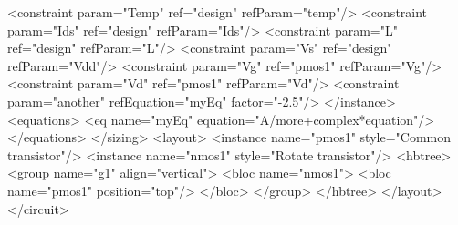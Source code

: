\begin{DoxyCodeInclude}
      <\textcolor{keywordtype}{constraint} \textcolor{keyword}{param}=\textcolor{stringliteral}{"Temp"} \textcolor{keyword}{ref}=\textcolor{stringliteral}{"design"} \textcolor{keyword}{refParam}=\textcolor{stringliteral}{"temp"}/>
      <\textcolor{keywordtype}{constraint} \textcolor{keyword}{param}=\textcolor{stringliteral}{"Ids"}  \textcolor{keyword}{ref}=\textcolor{stringliteral}{"design"} \textcolor{keyword}{refParam}=\textcolor{stringliteral}{"Ids"}/>
      <\textcolor{keywordtype}{constraint} \textcolor{keyword}{param}=\textcolor{stringliteral}{"L"}    \textcolor{keyword}{ref}=\textcolor{stringliteral}{"design"} \textcolor{keyword}{refParam}=\textcolor{stringliteral}{"L"}/>
      <\textcolor{keywordtype}{constraint} \textcolor{keyword}{param}=\textcolor{stringliteral}{"Vs"}   \textcolor{keyword}{ref}=\textcolor{stringliteral}{"design"} \textcolor{keyword}{refParam}=\textcolor{stringliteral}{"Vdd"}/>
      <\textcolor{keywordtype}{constraint} \textcolor{keyword}{param}=\textcolor{stringliteral}{"Vg"}   \textcolor{keyword}{ref}=\textcolor{stringliteral}{"pmos1"}  \textcolor{keyword}{refParam}=\textcolor{stringliteral}{"Vg"}/>
      <\textcolor{keywordtype}{constraint} \textcolor{keyword}{param}=\textcolor{stringliteral}{"Vd"}   \textcolor{keyword}{ref}=\textcolor{stringliteral}{"pmos1"}  \textcolor{keyword}{refParam}=\textcolor{stringliteral}{"Vd"}/>
      <\textcolor{keywordtype}{constraint} \textcolor{keyword}{param}=\textcolor{stringliteral}{"another"} \textcolor{keyword}{refEquation}=\textcolor{stringliteral}{"myEq"} \textcolor{keyword}{factor}=\textcolor{stringliteral}{"-2.5"}/>
    </\textcolor{keywordtype}{instance}>
    <\textcolor{keywordtype}{equations}>
      <\textcolor{keywordtype}{eq} \textcolor{keyword}{name}=\textcolor{stringliteral}{"myEq"} \textcolor{keyword}{equation}=\textcolor{stringliteral}{"A/more+complex*equation"}/>
    </\textcolor{keywordtype}{equations}>
  </\textcolor{keywordtype}{sizing}>
  <\textcolor{keywordtype}{layout}>
    <\textcolor{keywordtype}{instance} \textcolor{keyword}{name}=\textcolor{stringliteral}{"pmos1"} \textcolor{keyword}{style}=\textcolor{stringliteral}{"Common transistor"}/>
    <\textcolor{keywordtype}{instance} \textcolor{keyword}{name}=\textcolor{stringliteral}{"nmos1"} \textcolor{keyword}{style}=\textcolor{stringliteral}{"Rotate transistor"}/>
    <\textcolor{keywordtype}{hbtree}>
      <\textcolor{keywordtype}{group} \textcolor{keyword}{name}=\textcolor{stringliteral}{"g1"} \textcolor{keyword}{align}=\textcolor{stringliteral}{"vertical"}>
        <\textcolor{keywordtype}{bloc} \textcolor{keyword}{name}=\textcolor{stringliteral}{"nmos1"}>
          <\textcolor{keywordtype}{bloc} \textcolor{keyword}{name}=\textcolor{stringliteral}{"pmos1"} \textcolor{keyword}{position}=\textcolor{stringliteral}{"top"}/>
        </\textcolor{keywordtype}{bloc}>
      </\textcolor{keywordtype}{group}>
    </\textcolor{keywordtype}{hbtree}>
  </\textcolor{keywordtype}{layout}>
</\textcolor{keywordtype}{circuit}>
\end{DoxyCodeInclude}
 
